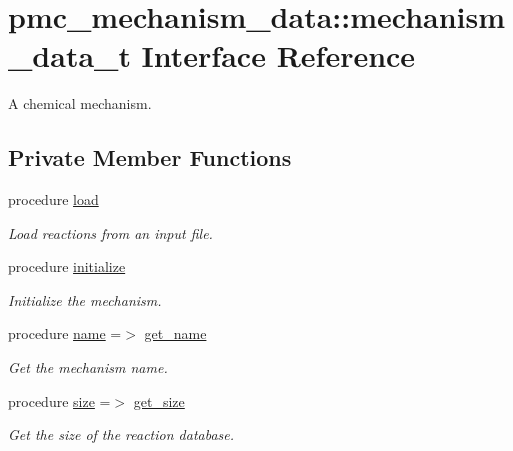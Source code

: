 \hypertarget{structpmc__mechanism__data_1_1mechanism__data__t}{}\section{pmc\+\_\+mechanism\+\_\+data\+:\+:mechanism\+\_\+data\+\_\+t Interface Reference}
\label{structpmc__mechanism__data_1_1mechanism__data__t}


A chemical mechanism.  


\subsection*{Private Member Functions}
\begin{DoxyCompactItemize}
\item 
procedure \mbox{\hyperlink{structpmc__mechanism__data_1_1mechanism__data__t_a63432c95da41c0b5ac7fe8b2ccd367b5}{load}}
\begin{DoxyCompactList}\small\item\em Load reactions from an input file. \end{DoxyCompactList}\item 
procedure \mbox{\hyperlink{structpmc__mechanism__data_1_1mechanism__data__t_a147eb491f912f12d6f5b83fedaec784c}{initialize}}
\begin{DoxyCompactList}\small\item\em Initialize the mechanism. \end{DoxyCompactList}\item 
procedure \mbox{\hyperlink{structpmc__mechanism__data_1_1mechanism__data__t_a4d2a950ab7e95db1ad544ef2a5f71b1a}{name}} =$>$ \mbox{\hyperlink{namespacepmc__mechanism__data_a181513498181e44bd8e3d9cc4aa648e7}{get\+\_\+name}}
\begin{DoxyCompactList}\small\item\em Get the mechanism name. \end{DoxyCompactList}\item 
procedure \mbox{\hyperlink{structpmc__mechanism__data_1_1mechanism__data__t_a019c60641d25ae7cb745e8b23b961d82}{size}} =$>$ \mbox{\hyperlink{interfacepmc__aero__rep__data_1_1get__size}{get\+\_\+size}}
\begin{DoxyCompactList}\small\item\em Get the size of the reaction database. \end{DoxyCompactList}\item 

\end{DoxyCompactItemize}
